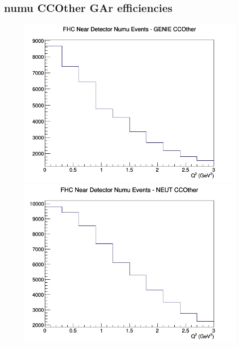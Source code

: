 \subsection{numu CCOther GAr efficiencies}
\begin{figure}[h]
\includegraphics[width=\linewidth]{eff_Q2/GAr/CCOther_FHC_ND_numu_Q2_GENIE.png}
\endminipage
{}
\includegraphics[width=\linewidth]{eff_Q2/GAr/CCOther_FHC_ND_numu_Q2_NEUT.png}
\endminipage
{}

\end{figure}
